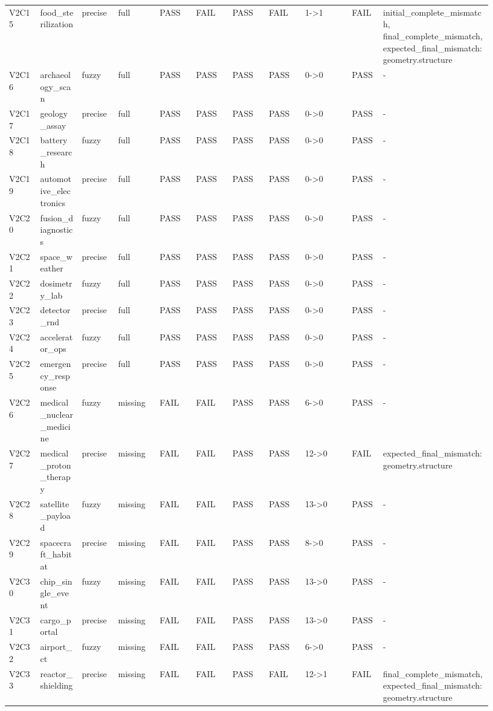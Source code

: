 \documentclass[11pt]{ctexart}
\begin{document}
\begin{longtable}{p{0.06\linewidth}p{0.08\linewidth}p{0.07\linewidth}p{0.08\linewidth}p{0.07\linewidth}p{0.07\linewidth}p{0.07\linewidth}p{0.07\linewidth}p{0.09\linewidth}p{0.06\linewidth}p{0.21\linewidth}}
V2C15 & food\_sterilization & precise & full & PASS & FAIL & PASS & FAIL & 1->1 & FAIL & initial\_complete\_mismatch, final\_complete\_mismatch, expected\_final\_mismatch:geometry.structure \\
V2C16 & archaeology\_scan & fuzzy & full & PASS & PASS & PASS & PASS & 0->0 & PASS & - \\
V2C17 & geology\_assay & precise & full & PASS & PASS & PASS & PASS & 0->0 & PASS & - \\
V2C18 & battery\_research & fuzzy & full & PASS & PASS & PASS & PASS & 0->0 & PASS & - \\
V2C19 & automotive\_electronics & precise & full & PASS & PASS & PASS & PASS & 0->0 & PASS & - \\
V2C20 & fusion\_diagnostics & fuzzy & full & PASS & PASS & PASS & PASS & 0->0 & PASS & - \\
V2C21 & space\_weather & precise & full & PASS & PASS & PASS & PASS & 0->0 & PASS & - \\
V2C22 & dosimetry\_lab & fuzzy & full & PASS & PASS & PASS & PASS & 0->0 & PASS & - \\
V2C23 & detector\_rnd & precise & full & PASS & PASS & PASS & PASS & 0->0 & PASS & - \\
V2C24 & accelerator\_ops & fuzzy & full & PASS & PASS & PASS & PASS & 0->0 & PASS & - \\
V2C25 & emergency\_response & precise & full & PASS & PASS & PASS & PASS & 0->0 & PASS & - \\
V2C26 & medical\_nuclear\_medicine & fuzzy & missing & FAIL & FAIL & PASS & PASS & 6->0 & PASS & - \\
V2C27 & medical\_proton\_therapy & precise & missing & FAIL & FAIL & PASS & PASS & 12->0 & FAIL & expected\_final\_mismatch:geometry.structure \\
V2C28 & satellite\_payload & fuzzy & missing & FAIL & FAIL & PASS & PASS & 13->0 & PASS & - \\
V2C29 & spacecraft\_habitat & precise & missing & FAIL & FAIL & PASS & PASS & 8->0 & PASS & - \\
V2C30 & chip\_single\_event & fuzzy & missing & FAIL & FAIL & PASS & PASS & 13->0 & PASS & - \\
V2C31 & cargo\_portal & precise & missing & FAIL & FAIL & PASS & PASS & 13->0 & PASS & - \\
V2C32 & airport\_ct & fuzzy & missing & FAIL & FAIL & PASS & PASS & 6->0 & PASS & - \\
V2C33 & reactor\_shielding & precise & missing & FAIL & FAIL & PASS & FAIL & 12->1 & FAIL & final\_complete\_mismatch, expected\_final\_mismatch:geometry.structure \\

\end{longtable}
\end{document}
